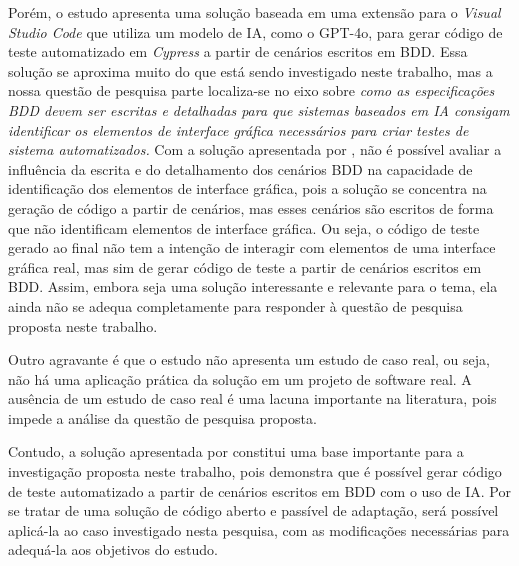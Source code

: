 Porém, o estudo  apresenta uma solução baseada em uma extensão para o \textit{Visual Studio Code} que utiliza um modelo de IA, como o GPT-4o, para gerar código de teste automatizado em \textit{Cypress} a partir de cenários escritos em BDD. Essa solução se aproxima muito do que está sendo investigado neste trabalho, mas a nossa questão de pesquisa parte localiza-se no eixo sobre \textit{como as especificações BDD devem ser escritas e detalhadas para que sistemas baseados em IA consigam identificar os elementos de interface gráfica necessários para criar testes de sistema automatizados.} Com a solução apresentada por , não é possível avaliar a influência da escrita e do detalhamento dos cenários BDD na capacidade de identificação dos elementos de interface gráfica, pois a solução se concentra na geração de código a partir de cenários, mas esses cenários são escritos de forma que não identificam elementos de interface gráfica. Ou seja, o código de teste gerado ao final não tem a intenção de interagir com elementos de uma interface gráfica real, mas sim de gerar código de teste a partir de cenários escritos em BDD. Assim, embora seja uma solução interessante e relevante para o tema, ela ainda não se adequa completamente para responder à questão de pesquisa proposta neste trabalho.

Outro agravante é que o estudo  não apresenta um estudo de caso real, ou seja, não há uma aplicação prática da solução em um projeto de software real. A ausência de um estudo de caso real é uma lacuna importante na literatura, pois impede a análise da questão de pesquisa proposta.

Contudo, a solução apresentada por  constitui uma base importante para a investigação proposta neste trabalho, pois demonstra que é possível gerar código de teste automatizado a partir de cenários escritos em BDD com o uso de IA. Por se tratar de uma solução de código aberto e passível de adaptação, será possível aplicá-la ao caso investigado nesta pesquisa, com as modificações necessárias para adequá-la aos objetivos do estudo.





